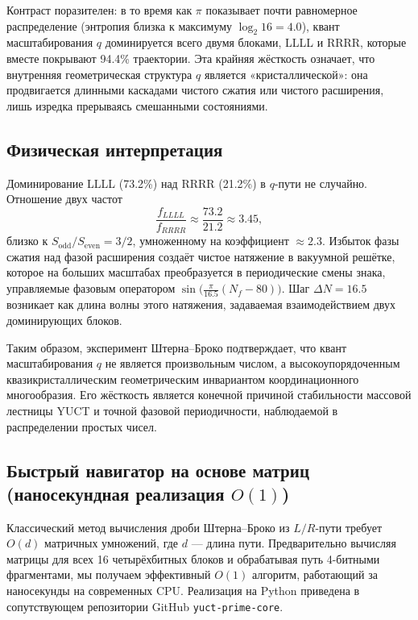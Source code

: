 \documentclass[12pt,a4paper]{article}
\begin{document}
	Контраст поразителен: в то время как \(\pi\) показывает почти равномерное распределение (энтропия близка к максимуму \(\log_2 16 = 4.0\)), квант масштабирования \(q\) доминируется всего двумя блоками, LLLL и RRRR, которые вместе покрывают 94.4\% траектории. Эта крайняя жёсткость означает, что внутренняя геометрическая структура \(q\) является «кристаллической»: она продвигается длинными каскадами чистого сжатия или чистого расширения, лишь изредка прерываясь смешанными состояниями.
	
	\subsection{Физическая интерпретация}
	
	Доминирование LLLL (73.2\%) над RRRR (21.2\%) в \(q\)-пути не случайно. Отношение двух частот
	\[
	\frac{f_{LLLL}}{f_{RRRR}} \approx \frac{73.2}{21.2} \approx 3.45,
	\]
	близко к \(S_{\mathrm{odd}}/S_{\mathrm{even}} = 3/2\), умноженному на коэффициент \(\approx 2.3\). Избыток фазы сжатия над фазой расширения создаёт чистое натяжение в вакуумной решётке, которое на больших масштабах преобразуется в периодические смены знака, управляемые фазовым оператором \(\sin\!\bigl(\frac{\pi}{16.5}(N_f-80)\bigr)\). Шаг \(\Delta N = 16.5\) возникает как длина волны этого натяжения, задаваемая взаимодействием двух доминирующих блоков.
	
	Таким образом, эксперимент Штерна–Броко подтверждает, что квант масштабирования \(q\) не является произвольным числом, а высокоупорядоченным квазикристаллическим геометрическим инвариантом координационного многообразия. Его жёсткость является конечной причиной стабильности массовой лестницы YUCT и точной фазовой периодичности, наблюдаемой в распределении простых чисел.
	
	\subsection{Быстрый навигатор на основе матриц (наносекундная реализация \(O(1)\))}
	
	Классический метод вычисления дроби Штерна–Броко из \(L/R\)-пути требует \(O(d)\) матричных умножений, где \(d\) — длина пути. Предварительно вычисляя матрицы для всех 16 четырёхбитных блоков и обрабатывая путь 4-битными фрагментами, мы получаем эффективный \(O(1)\) алгоритм, работающий за наносекунды на современных CPU. Реализация на Python приведена в сопутствующем репозитории GitHub \texttt{yuct-prime-core}.
	
\end{document}
